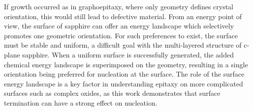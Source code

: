 If growth occurred as in graphoepitaxy, where only geometry defines crystal orientation, this would still lead to defective material.
From an energy point of view, the surface of sapphire can offer an energy landscape which selectively promotes one geometric orientation.
For such preferences to exist, the surface must be stable and uniform, a difficult goal with the multi-layered structure of c-plane sapphire.
When a uniform surface is successfully generated, the added chemical energy landscape is superimposed on the geometry, resulting in a single orientation being preferred for nucleation at the surface.
The role of the surface energy landscape is a key factor in understanding epitaxy on more complicated surfaces such as complex oxides, as this work demonstrates that surface termination can have a strong effect on nucleation.
